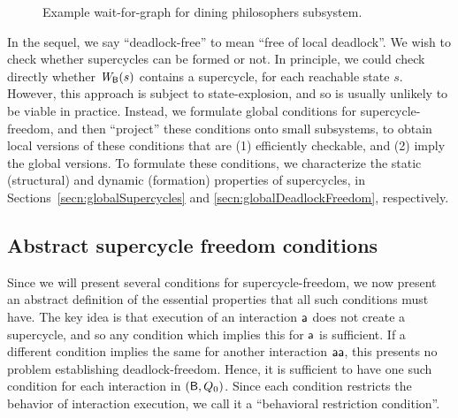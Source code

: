 \begin{figure*}[ht]
  \begin{center}
   \scalebox{0.4}{}
   \caption{Example wait-for-graph for dining philosophers subsystem.}
   \label{fig:sc-local-dining}
  \end{center}
\end{figure*}






In the sequel, we say ``deadlock-free'' to mean ``free of local deadlock''.
%
We wish to check whether supercycles can be formed or not.
In principle, we could check directly whether $\mathit{W}_{\mathsf{B}}({s})$ contains a supercycle, for each
reachable state $s$. However, this approach is subject to state-explosion, and so is usually
unlikely to be viable in practice.  Instead, we formulate global conditions for supercycle-freedom,
and then ``project'' these conditions onto small subsystems, to obtain local versions of these
conditions that are (1) efficiently checkable, and (2) imply the global versions.
To formulate these conditions, we characterize the static (structural) and dynamic
(formation) properties of supercycles, in Sections~\ref{secn:globalSupercycles} and \ref{secn:globalDeadlockFreedom}, respectively.




\subsection{Abstract supercycle freedom conditions}
\label{secn:abstract-scfree-conditions}

Since we will present several conditions for supercycle-freedom, we now present an abstract
definition of the essential properties that all such conditions must have.  The key idea is that
execution of an interaction $\mathsf{a}$ does not create a supercycle, and so any condition which implies 
this for $\mathsf{a}$ is sufficient. If a different condition implies the same for another interaction
$\mathsf{aa}$, this presents no problem \wrt establishing deadlock-freedom. Hence, it is sufficient to
have one such condition for each interaction in  $(\mathsf{B},Q_0)$. Since each condition restricts the
behavior of interaction execution, we call it a ``behavioral restriction condition''.

